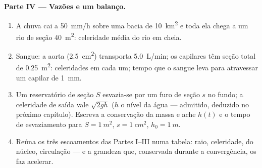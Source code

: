 \begin{problem}
\medskip
\noindent\textbf{Parte IV --- Vazões e um balanço.}
\begin{enumerate}[resume]
  \item A chuva cai a \qty{50}{mm/h} sobre uma bacia de \qty{10}{km^2}
        e toda ela chega a um rio de seção \qty{40}{m^2}: celeridade
        média do rio em cheia.
  \item Sangue: a aorta (\qty{2.5}{cm^2}) transporta \qty{5.0}{L/min}; os
        capilares têm seção total de \qty{0.25}{m^2}: celeridades em
        cada um; tempo que o sangue leva para atravessar um capilar de \qty{1}{mm}.
  \item Um reservatório de seção $S$ esvazia-se por um furo de seção $s$ no
        fundo; a celeridade de saída vale $\sqrt{2gh}$ ($h$ o nível da água
        --- admitido, deduzido no próximo capítulo). Escreva a conservação
        da massa e ache $h(t)$ e o tempo de esvaziamento para
        $S = \qty{1}{m^2}$, $s = \qty{1}{cm^2}$, $h_0 = \qty{1}{m}$.
  \item Reúna os três escoamentos das Partes I--III numa tabela: raio,
        celeridade,  do núcleo, circulação --- e a
        grandeza que, conservada durante a convergência, os faz
        acelerar.
\end{enumerate}
\end{problem}
